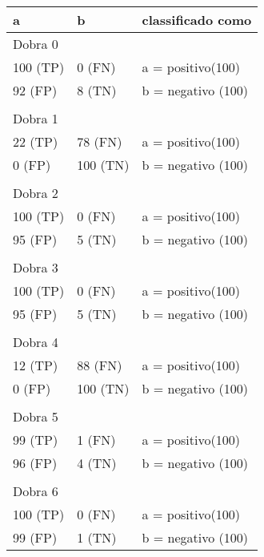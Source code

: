 \documentclass[template.tex]{subfiles}
\begin{document}
\begin{table}[!h]
    \begin{tabular}{lll}
    a                           & b                                 & classificado como                                  \\ \hline
    Dobra 0 \\    
    100 (TP)                    &0 (FN)                     & a = positivo(100) \\
    92 (FP)                 &8 (TN)                     & b = negativo (100) \\
    &&\\
    Dobra 1    \\
    22 (TP)                 &78 (FN)                    & a = positivo(100) \\
    0 (FP)                  &100 (TN)               & b = negativo (100) \\   
    &&\\ 
    Dobra 2    \\
    100 (TP)                    &0 (FN)                     & a = positivo(100) \\
    95 (FP)                 &5 (TN)                     & b = negativo (100) \\   
    &&\\
    Dobra 3    \\
    100 (TP)                    &0 (FN)                     & a = positivo(100) \\
    95 (FP)                 &5 (TN)                     & b = negativo (100) \\   
    &&\\
    Dobra 4    \\
    12 (TP)                 &88 (FN)                    & a = positivo(100) \\ 
    0 (FP)                  &100 (TN)                   & b = negativo (100) \\
    &&\\
    Dobra 5    \\
    99 (TP)                 &1 (FN)                     & a = positivo(100) \\ 
    96 (FP)                 &4 (TN)                     & b = negativo (100) \\
    &&\\
    Dobra 6    \\
    100 (TP)                    &0 (FN)                     & a = positivo(100) \\ 
    99 (FP)                 &1 (TN)                 & b = negativo (100) \\

\end{tabular}
\end{table}
\end{document}
